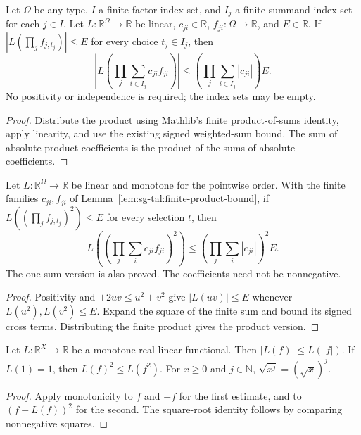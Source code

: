\begin{lemma}\label{lem:sg-tal:finite-product-bound}
\leanok
{}
Let $\Omega$ be any type, $I$ a finite factor index set, and $I_j$ a finite summand
index set for each $j\in I$. Let $L:\mathbb R^\Omega\to\mathbb R$ be linear,
$c_{ji}\in\mathbb R$, $f_{ji}:\Omega\to\mathbb R$, and $E\in\mathbb R$.
If $|L(\prod_j f_{j,t_j})|\le E$ for every choice $t_j\in I_j$, then
\[
 \left|L\left(\prod_j\sum_{i\in I_j}c_{ji}f_{ji}\right)\right|
 \le \left(\prod_j\sum_{i\in I_j}|c_{ji}|\right) E.
\]
No positivity or independence is required; the index sets may be empty.
\end{lemma}
\begin{proof}
\leanok
Distribute the product using Mathlib's finite product-of-sums identity,
apply linearity, and use the existing signed weighted-sum bound.
The sum of absolute product coefficients is the product of the sums of absolute coefficients.
\end{proof}

\begin{lemma}
\label{lem:sg-tal:finite-product-square-bound}
\leanok
{}
Let $L:\mathbb R^\Omega\to\mathbb R$ be linear and monotone for the pointwise order.
With the finite families $c_{ji},f_{ji}$ of Lemma~\ref{lem:sg-tal:finite-product-bound},
if $L((\prod_j f_{j,t_j})^2)\le E$ for every selection $t$, then
\[
 L\left(\left(\prod_j\sum_i c_{ji}f_{ji}\right)^2\right)
 \le \left(\prod_j\sum_i|c_{ji}|\right)^2 E.
\]
The one-sum version is also proved. The coefficients need not be nonnegative.
\end{lemma}
\begin{proof}
\leanok
Positivity and $\pm2uv\le u^2+v^2$ give $|L(uv)|\le E$ whenever
$L(u^2),L(v^2)\le E$. Expand the square of the finite sum and bound its signed
cross terms. Distributing the finite product gives the product version.
\end{proof}

\begin{lemma}
\label{lem:sg-tal:positive-functional-square}
\leanok
{}
Let $L:\mathbb R^X\to\mathbb R$ be a monotone real linear functional. Then
$|L(f)|\le L(|f|)$. If $L(1)=1$, then $L(f)^2\le L(f^2)$.
For $x\ge0$ and $j\in\mathbb N$, $\sqrt{x^j}=(\sqrt{x})^j$.
\end{lemma}
\begin{proof}
\leanok
Apply monotonicity to $f$ and $-f$ for the first estimate, and to $(f-L(f))^2$
for the second. The square-root identity follows by comparing nonnegative squares.
\end{proof}

